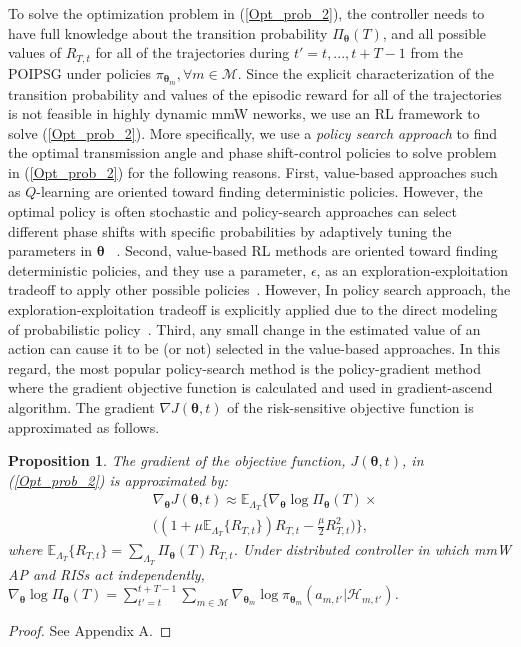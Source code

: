 \documentclass[conference]{IEEEtran}
\newtheorem{proposition}{\bf Proposition}
\begin{document}
To solve the optimization problem in (\ref{Opt_prob_2}), the controller needs to have full knowledge about the transition probability $\Pi_{\boldsymbol{\theta}}(T)$, and all possible values of $R_{T,t}$ for all of the trajectories during $t'=t,...,t+T-1$ from the POIPSG under policies $\pi_{\boldsymbol{\theta}_m},\forall m \in\mathcal{M}$. Since the explicit characterization of the transition probability and values of the episodic reward for all of the trajectories is not feasible in highly dynamic mmW neworks, we use an RL framework to solve (\ref{Opt_prob_2}). More specifically, we use a \emph{policy search approach} to find the optimal transmission angle and phase shift-control policies to solve problem in (\ref{Opt_prob_2}) for the following reasons. First, value-based approaches such as $Q$-learning are oriented toward finding deterministic policies. However, the optimal policy is often stochastic and policy-search approaches can select different phase shifts with specific probabilities by adaptively tuning the parameters in $\boldsymbol{\theta}$ ~\cite{Sutton2018}. Second, value-based RL methods are oriented toward finding deterministic policies, and they use a parameter, $\epsilon$, as an exploration-exploitation tradeoff to apply other possible policies~\cite{Sutton2018}. However, In policy search approach, the exploration-exploitation tradeoff is explicitly applied due to the direct modeling of probabilistic policy~\cite{Sutton2018}. Third, any small change in the estimated value of an action can cause it to be (or not) selected in the value-based approaches. In this regard, the most popular policy-search method is the policy-gradient method where the gradient objective function is calculated and used in gradient-ascend algorithm. The gradient $\nabla J(\boldsymbol{\theta},t)$ of the risk-sensitive objective function is approximated as follows.
\begin{proposition}
\textnormal{The gradient of the objective function, $J(\boldsymbol{\theta},t)$, in (\ref{Opt_prob_2}) is approximated by:}
\begin{align}
&\nabla_{\boldsymbol{\theta}}J(\boldsymbol{\theta},t)\approx
 \mathbb{E}_{\Lambda_{T}}\{\nabla_{\boldsymbol{\theta}}\log\Pi_{\boldsymbol{\theta}}(T) \times
\nonumber \\ &
\big((1+\mu \mathbb{E}_{\Lambda_{T}}\{R_{T,t}\}) R_{T,t}-\frac{\mu}{2}R_{T,t}^2\big)\},
\label{gradient_equation}
\end{align}
\textnormal{where $\mathbb{E}_{\Lambda_{T}}\{R_{T,t}\}=\sum_{\Lambda_{T}}\Pi_{\boldsymbol{\theta}}(T) R_{T,t}$. Under distributed controller in which mmW AP and RISs act independently, $ \nabla_{\boldsymbol{\theta}}\log\Pi_{\boldsymbol{\theta}}(T)=\sum_{t'=t}^{t+T-1} \sum_{m \in \mathcal{M}} \nabla_{\boldsymbol{\theta}_m} \log\pi_{\boldsymbol{\theta}_m}(a_{m,t'}|\mathcal{H}_{m,t'})$.
}
\end{proposition}
\begin{proof}
See Appendix A.
\end{proof}
\end{document}
